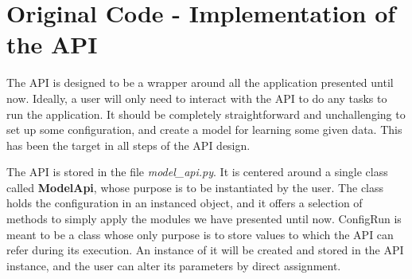 \documentclass[a4paper, 11pt]{report}
\begin{document}
   \section{Original Code - Implementation of the API}
   The API is designed to be a wrapper around all the application presented until now. Ideally, a user will only need to interact with the API to do any tasks to run the application. It should be completely straightforward and unchallenging to set up some configuration, and create a model for learning some given data. This has been the target in all steps of the API design.

   The API is stored in the file \textit{model\_api.py}. It is centered around a single class called \textbf{ModelApi}, whose purpose is to be instantiated by the user. The class holds the configuration in an instanced object, and it offers a selection of methods to simply apply the modules we have presented until now.
   ConfigRun is meant to be a class whose only purpose is to store values to which the API can refer during its execution. An instance of it will be created and stored in the API instance, and the user can alter its parameters by direct assignment.
\end{document}
